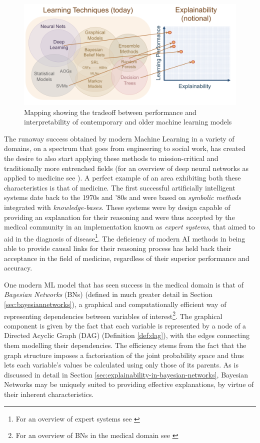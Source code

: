 \begin{figure}[htbp]
\centerline{\includegraphics[width=\textwidth]{introduction/images/darpa-comparison-methods}}
\caption{Mapping showing the tradeoff between performance and interpretability of contemporary and older machine learning models \citep{gunning2017explainable}}
\label{fig:darpa-comparison-methods}
\end{figure}

The runaway success obtained by modern Machine Learning in a variety of domains, on a spectrum that goes from engineering to social work, has created the desire to also start applying these methods to mission-critical and traditionally more entrenched fields  (for an overview of deep neural networks as applied to medicine see \citet{Travers2018}).  
A perfect example of an area exhibiting both these characteristics is that of medicine.  
The first successful artificially intelligent systems date back to the 1970s and '80s and were based on \textit{symbolic methods} integrated with \textit{knowledge-bases}.  
These systems were by design capable of providing an explanation for their reasoning and were thus accepted by the medical community in an implementation known as \textit{expert systems}, that aimed to aid in the diagnosis of disease\footnote{For an overview of expert systems see \citet{Liao2005}}. 
The deficiency of modern AI methods in being able to provide causal links for their reasoning process has held back their acceptance in the field of medicine, regardless of their superior performance and accuracy.

One modern ML model that has seen success in the medical domain is that of \textit{Bayesian Networks} (BNs) (defined in much greater detail in Section \ref{sec:bayesiannetworks}), a graphical and computationally efficient way of representing dependencies between variables of interest\footnote{For an overview of BNs in the medical domain see \citet{Lucas2001}}.  
The graphical component is given by the fact that each variable is represented by a node of a Directed Acyclic Graph (DAG) (Definition \ref{def:dag}), with the edges connecting them modelling their dependencies.  
The efficiency stems from the fact that the graph structure imposes a factorisation of the joint probability space and thus lets each variable's values be calculated using only those of its parents.
As is discussed in detail in Section \ref{sec:explainability-in-bayesian-networks}, Bayesian Networks may be uniquely suited to providing effective explanations, by virtue of their inherent characteristics.

